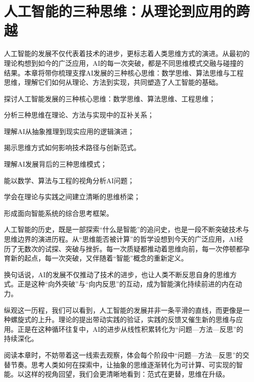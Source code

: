 \chapter{人工智能的三种思维：从理论到应用的跨越}

人工智能的发展不仅代表着技术的进步，更标志着人类思维方式的演进。从最初的理论构想到如今的广泛应用，AI的每一次突破，都是不同思维模式交融与碰撞的结果。本章将带你梳理支撑AI发展的三种核心思维：数学思维、算法思维与工程思维，理解它们如何从理论、方法到实现，共同塑造了人工智能的基础。

\begin{introduction}
  \item 探讨人工智能发展的三种核心思维：数学思维、算法思维、工程思维；
  \item 分析三种思维在理论、方法与实现中的互补关系；
  \item 理解AI从抽象推理到现实应用的逻辑演进；
  \item 揭示思维方式如何影响技术路径与创新范式。
\end{introduction}

\begin{introduction}
  \item 理解AI发展背后的三种思维模式；
  \item 能以数学、算法与工程的视角分析AI问题；
  \item 学会在理论与实践之间建立清晰的思维桥梁；
  \item 形成面向智能系统的综合思考框架。
\end{introduction}

人工智能的历史，既是一部探索“什么是智能”的追问史，也是一段不断突破技术与思维边界的演进历程。从“思维能否被计算”的哲学设想到今天的广泛应用，AI经历了无数次的试探、突破与挫折。每一次质疑都推动着思维向前，每一次停顿都孕育新的起点，每一次突破，又伴随着“智能”概念的重新定义。

换句话说，AI的发展不仅推动了技术的进步，也让人类不断反思自身的思维方式。正是这种“向外突破”与“向内反思”的互动，成为智能演化持续前进的内在动力。

纵观这一历程，我们可以看到，人工智能的发展并非一条平滑的直线，而更像是一种螺旋式的上升。理论的提出带动实践的验证，实践的反馈又催生新的思维与应用。正是在这种循环往复中，AI的进步从线性积累转化为“问题—方法—反思”的持续深化。

阅读本章时，不妨带着这一线索去观察，体会每个阶段中“问题—方法—反思”的交替节奏。思考人类如何在探索中，让抽象的思维逐渐转化为可计算、可实现的智能。以这样的视角回望，我们会更清晰地看到：范式在更替，思维在升级。

